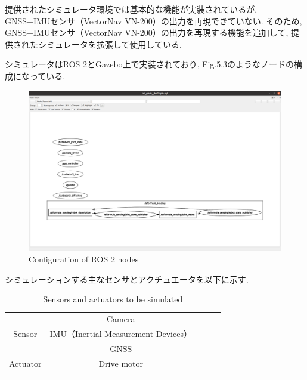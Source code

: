 提供されたシミュレータ環境では基本的な機能が実装されているが, GNSS+IMUセンサ（VectorNav VN-200）の出力を再現できていない.
そのため, GNSS+IMUセンサ（VectorNav VN-200）の出力を再現する機能を追加して, 提供されたシミュレータを拡張して使用している.

シミュレータはROS 2とGazebo上で実装されており, Fig.5.3のようなノードの構成になっている.

\begin{figure}[H]
  \centering
 \includegraphics[keepaspectratio, scale=0.2]
      {images/rqt.png}
 \caption{Configuration of ROS 2 nodes}
 \label{fig:simulator}
\end{figure}

シミュレーションする主なセンサとアクチュエータを以下に示す.

\begin{table}[H]
  \centering
  \caption{Sensors and actuators to be simulated}
  \begin{tabular}{lclll}
  \cline{1-2}
  \multicolumn{1}{|l|}{}         & \multicolumn{1}{c|}{Camera}      &  &  &  \\
  \multicolumn{1}{|c|}{Sensor}   & \multicolumn{1}{c|}{IMU（Inertial Measurement Devices）} &  &  &  \\
  \multicolumn{1}{|l|}{}         & \multicolumn{1}{c|}{GNSS}        &  &  &  \\ \cline{1-2}
  \multicolumn{1}{|l|}{Actuator} & \multicolumn{1}{c|}{Drive motor} &  &  &  \\ \cline{1-2}
                                 & \multicolumn{1}{l}{}             &  &  & 
  \end{tabular}
\end{table}

